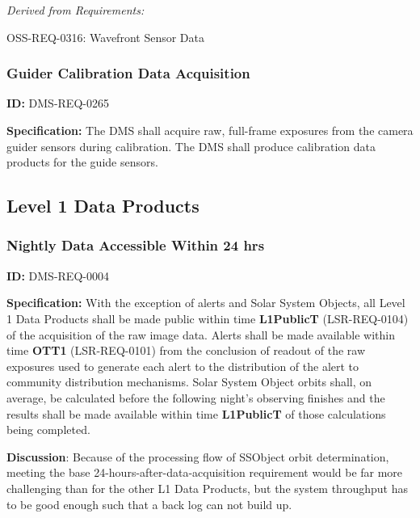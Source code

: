 \documentclass[SE,toc,lsstdraft]{lsstdoc}
\begin{document}
\emph{Derived from Requirements:}

OSS-REQ-0316:
Wavefront Sensor Data \newline


\subsubsection{Guider Calibration Data Acquisition}

\label{DMS-REQ-0265}
\textbf{ID:} DMS-REQ-0265

\textbf{Specification:} The DMS shall acquire raw, full-frame exposures from the camera guider sensors during calibration. The DMS shall produce calibration data products for the guide sensors.






\subsection{Level 1 Data Products}





\subsubsection{Nightly Data Accessible Within 24 hrs}

\label{DMS-REQ-0004}
\textbf{ID:} DMS-REQ-0004

\textbf{Specification:} With the exception of alerts and Solar System Objects, all Level 1 Data Products shall be made public within time \textbf{L1PublicT} (LSR-REQ-0104) of the acquisition of the raw image data. Alerts shall be made available within time \textbf{OTT1} (LSR-REQ-0101) from the conclusion of readout of the raw exposures used to generate each alert to the distribution of the alert to community distribution mechanisms.  Solar System Object orbits shall, on average, be calculated before the following night's observing finishes and the results shall be made available within time \textbf{L1PublicT} of those calculations being completed.

\textbf{Discussion}: Because of the processing flow of SSObject orbit determination, meeting the base 24-hours-after-data-acquisition requirement would be far more challenging than for the other L1 Data Products, but the system throughput has to be good enough such that a back log can not build up.
\end{document}
